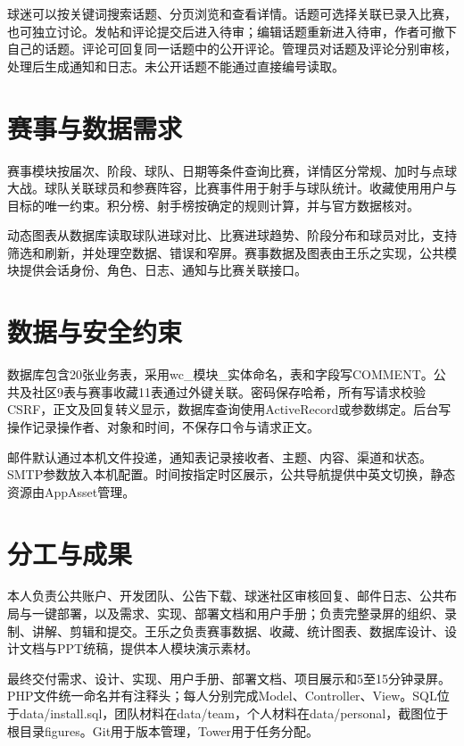 \documentclass[UTF8,a4paper,11pt,fontset=windows]{ctexart}
\begin{document}
球迷可以按关键词搜索话题、分页浏览和查看详情。话题可选择关联已录入比赛，也可独立讨论。发帖和评论提交后进入待审；编辑话题重新进入待审，作者可撤下自己的话题。评论可回复同一话题中的公开评论。管理员对话题及评论分别审核，处理后生成通知和日志。未公开话题不能通过直接编号读取。

\section{赛事与数据需求}
赛事模块按届次、阶段、球队、日期等条件查询比赛，详情区分常规、加时与点球大战。球队关联球员和参赛阵容，比赛事件用于射手与球队统计。收藏使用用户与目标的唯一约束。积分榜、射手榜按确定的规则计算，并与官方数据核对。

动态图表从数据库读取球队进球对比、比赛进球趋势、阶段分布和球员对比，支持筛选和刷新，并处理空数据、错误和窄屏。赛事数据及图表由王乐之实现，公共模块提供会话身份、角色、日志、通知与比赛关联接口。

\section{数据与安全约束}
数据库包含20张业务表，采用wc\_模块\_实体命名，表和字段写COMMENT。公共及社区9表与赛事收藏11表通过外键关联。密码保存哈希，所有写请求校验CSRF，正文及回复转义显示，数据库查询使用ActiveRecord或参数绑定。后台写操作记录操作者、对象和时间，不保存口令与请求正文。

邮件默认通过本机文件投递，通知表记录接收者、主题、内容、渠道和状态。SMTP参数放入本机配置。时间按指定时区展示，公共导航提供中英文切换，静态资源由AppAsset管理。

\section{分工与成果}
本人负责公共账户、开发团队、公告下载、球迷社区审核回复、邮件日志、公共布局与一键部署，以及需求、实现、部署文档和用户手册；负责完整录屏的组织、录制、讲解、剪辑和提交。王乐之负责赛事数据、收藏、统计图表、数据库设计、设计文档与PPT统稿，提供本人模块演示素材。

最终交付需求、设计、实现、用户手册、部署文档、项目展示和5至15分钟录屏。PHP文件统一命名并有注释头；每人分别完成Model、Controller、View。SQL位于data/install.sql，团队材料在data/team，个人材料在data/personal，截图位于根目录figures。Git用于版本管理，Tower用于任务分配。
\end{document}
